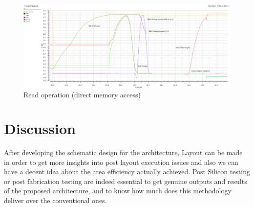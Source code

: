 \begin{figure}[H]
\centering
\includegraphics[width=1.0\textwidth]{read_with_peripherals.png}
\caption{Read operation (direct memory access)}
\label{fig:Figure}
\end{figure}

\section{Discussion}
\paragraph{}


After developing the schematic design for the architecture, Layout can be made in order to get more insights into post layout execution issues and also we can have a decent idea about the area efficiency actually achieved. Post Silicon testing or post fabrication testing are indeed essential to get genuine outputs and results of the proposed architecture, and to know how much does this methodology deliver over the conventional ones.

